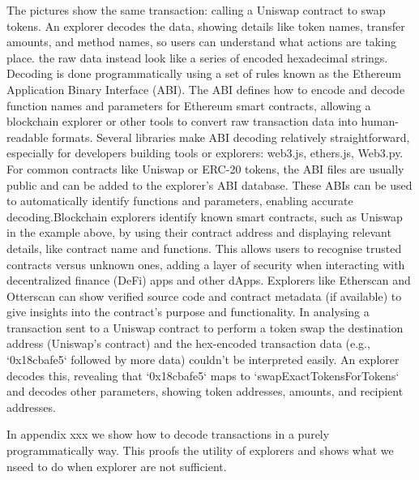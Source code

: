 \documentclass[11pt,a4paper,titlepage]{scrartcl}
\begin{document}
The pictures show the same transaction: calling a Uniswap contract to swap tokens.  An explorer decodes the data, showing details like token names, transfer amounts, and method names, so users can understand what actions are taking place.
the raw data instead look like a series of encoded hexadecimal strings. Decoding is done programmatically using a set of rules known as the Ethereum Application Binary Interface (ABI). The ABI defines how to encode and decode function names and parameters for Ethereum smart contracts, allowing a blockchain explorer or other tools to convert raw transaction data into human-readable formats. Several libraries make ABI decoding relatively straightforward, especially for developers building tools or explorers:  web3.js,  ethers.js, Web3.py.
For common contracts like Uniswap or ERC-20 tokens, the ABI files are usually public and can be added to the explorer's ABI database. These ABIs can be used to automatically identify functions and parameters, enabling accurate decoding.Blockchain explorers identify known smart contracts, such as Uniswap in the example above, by using their contract address and displaying relevant details, like contract name and functions. This allows users to recognise trusted contracts versus unknown ones, adding a layer of security when interacting with decentralized finance (DeFi) apps and other dApps.
Explorers like Etherscan and Otterscan can show verified source code and contract metadata (if available) to give insights into the contract’s purpose and functionality. In analysing a transaction sent to a Uniswap contract to perform a token swap the destination address (Uniswap’s contract) and the hex-encoded transaction data (e.g., `0x18cbafe5` followed by more data) couldn’t be interpreted easily. An explorer decodes this, revealing that `0x18cbafe5` maps to `swapExactTokensForTokens` and decodes other parameters, showing token addresses, amounts, and recipient addresses. 




In appendix xxx we show how to decode transactions in a purely programmatically way. This proofs the utility of explorers and shows what we nseed to do when explorer are not sufficient.
\end{document}
